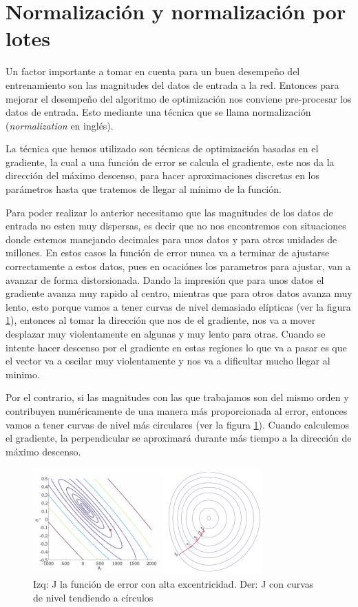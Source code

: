\section{Normalización y normalización por lotes}

Un factor importante a tomar en cuenta para un buen desempeño del entrenamiento son las magnitudes del datos de entrada a la red. Entonces para mejorar el desempeño del algoritmo de optimización nos conviene pre-procesar los datos de entrada. Esto mediante una técnica que se llama normalización (\emph{normalization} en inglés).

La técnica que hemos utilizado son técnicas de optimización basadas en el gradiente, la cual a una función de error se calcula el gradiente, este nos da la dirección del máximo descenso, para  hacer aproximaciones discretas en los parámetros hasta que tratemos de llegar al mínimo de la función.
 
Para poder realizar lo anterior necesitamo que las magnitudes de los datos de entrada no esten muy dispersas, es decir que no nos encontremos con situaciones donde estemos manejando decimales para unos datos y para otros unidades de millones. En estos casos la función de error nunca va a terminar de ajustarse correctamente a estos datos, pues en ocaciónes los parametros para ajustar, van a avanzar de forma distorsionada. Dando la impresión que para unos datos el gradiente avanza muy rapido al centro, mientras que para otros datos avanza muy lento, esto porque vamos a tener curvas de nivel demasiado elípticas (ver la figura \ref{fig:curvasNivel}), entonces al tomar la dirección que nos de el gradiente, nos va a mover desplazar muy violentamente en algunas y muy lento para otras. Cuando se intente hacer descenso por el gradiente en estas regiones lo que va a pasar es que el vector va a oscilar muy violentamente y  nos va a dificultar mucho llegar al minimo.

Por el contrario, si las magnitudes con las que trabajamos son del mismo orden y contribuyen numéricamente de una manera más proporcionada al error, entonces vamos a tener curvas de nivel  más circulares (ver la figura \ref{fig:curvasNivel}). Cuando calculemos el gradiente, la perpendicular se aproximará durante más tiempo a la dirección de máximo descenso. 

\begin{figure}[H]
 \centering
 \includegraphics[scale=0.5]{../Figuras/curvasDeNivel.png}
 \caption{Izq: J la función de error con alta excentricidad. Der: J con curvas de nivel tendiendo a círculos}
 \label{fig:curvasNivel}
\end{figure}

